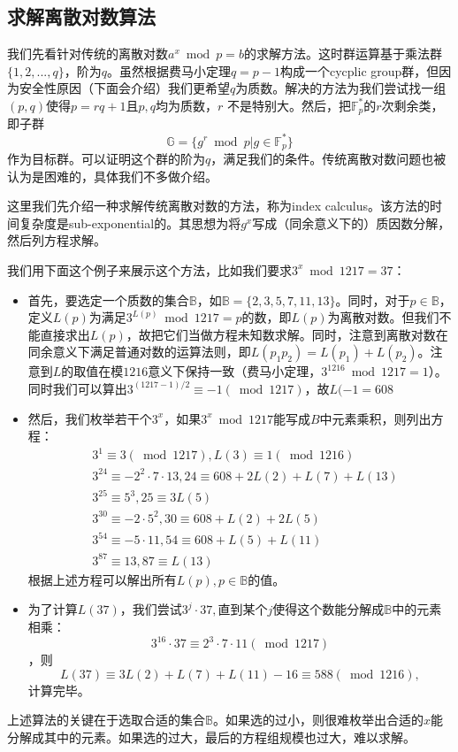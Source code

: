 \documentclass[12pt]{article}
\begin{document}
\subsection{求解离散对数算法}
我们先看针对传统的离散对数$a^x \bmod p = b$的求解方法。这时群运算基于乘法群$\{1,2,...,q\}$，阶为$q$。虽然根据费马小定理$q=p-1$构成一个cycplic group群，但因为安全性原因（下面会介绍）我们更希望$q$为质数。解决的方法为我们尝试找一组$(p,q)$使得$p=rq+1$且$p,q$均为质数，$r$ 不是特别大。然后，把$\mathbb{F}_p^*$的$r$次剩余类，即子群
$$\mathbb{G} = \{g^r \bmod p | g \in \mathbb{F}_p^*\}$$
作为目标群。可以证明这个群的阶为$q$，满足我们的条件。传统离散对数问题也被认为是困难的，具体我们不多做介绍。

这里我们先介绍一种求解传统离散对数的方法，称为index calculus。该方法的时间复杂度是sub-exponential的。其思想为将$g^x$写成（同余意义下的）质因数分解，然后列方程求解。

我们用下面这个例子来展示这个方法，比如我们要求$3^x \bmod 1217 = 37$：
\begin{itemize}
\item 首先，要选定一个质数的集合$\mathbb{B}$，如$\mathbb{B} = \{2,3,5,7,11,13\}$。同时，对于$ p\in \mathbb{B}$，定义$L(p)$为满足$3^{L(p)} \bmod 1217 = p$的数，即$L(p)$为离散对数。但我们不能直接求出$L(p)$，故把它们当做方程未知数求解。同时，注意到离散对数在同余意义下满足普通对数的运算法则，即$L(p_1p_2)=L(p_1)+L(p_2)$。注意到$L$的取值在模$1216$意义下保持一致（费马小定理，$3^{1216} \bmod 1217 = 1$）。同时我们可以算出$3^{(1217-1)/2} \equiv -1 (\bmod 1217)$，故$L(-1 = 608$
\item  然后，我们枚举若干个$3^x$，如果$3^x \bmod 1217$能写成$B$中元素乘积，则列出方程：
\begin{align*}
	& 3^1 \equiv 3 (\bmod 1217), L(3) \equiv 1 (\bmod 1216)\\
	& 3^{24} \equiv −2^2\cdot 7\cdot 13, 24 \equiv 608+2L(2)+L(7)+L(13)\\
	& 3^{25} \equiv 5^3, 25 \equiv 3L(5)\\
	& 3^{30} \equiv -2\cdot 5^2, 30 \equiv 608 + L(2) + 2L(5) \\
	& 3^{54} \equiv -5\cdot 11, 54 \equiv 608 + L(5) + L(11)\\
	& 3^{87} \equiv 13, 87 \equiv L(13)
\end{align*}
根据上述方程可以解出所有$L(p), p \in \mathbb{B}$的值。
\item 为了计算$L(37)$，我们尝试$3^j\cdot 37,$直到某个$j$使得这个数能分解成$\mathbb{B}$中的元素相乘：
$$3^{16} \cdot 37 \equiv 2^3\cdot 7 \cdot 11 (\bmod 1217)$$，则
$$L(37) \equiv 3L(2) + L(7) + L(11) − 16 \equiv 588 (\bmod 1216),$$
计算完毕。
\end{itemize}
上述算法的关键在于选取合适的集合$\mathbb{B}$。如果选的过小，则很难枚举出合适的$x$能分解成其中的元素。如果选的过大，最后的方程组规模也过大，难以求解。
\end{document}
